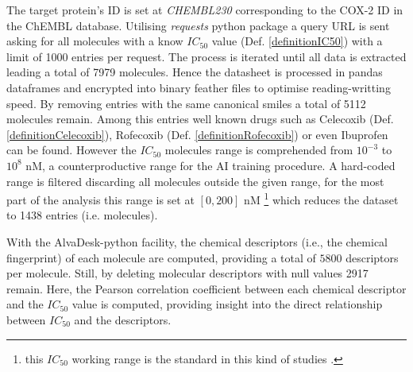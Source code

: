 \documentclass[11pt]{article}
\begin{document}
The target protein's ID is set at \emph{CHEMBL230} corresponding to the COX-2 ID in the ChEMBL database. Utilising \emph{requests} python package\cite{PythonPackageRequests} a query URL is sent asking for all molecules with a know $IC_{50}$ value (Def. \ref{definitionIC50}) with a limit of 1000 entries per request. The process is iterated until all data is extracted leading a total of 7979 molecules. Hence the datasheet is processed in pandas dataframes\cite{PythonPackagePandas} and encrypted into binary feather files to optimise reading-writting speed. By removing entries with the same canonical smiles a total of 5112 molecules remain. Among this entries well known drugs such as Celecoxib (Def. \ref{definitionCelecoxib}), Rofecoxib (Def. \ref{definitionRofecoxib}) or even Ibuprofen can be found. However the $IC_{50}$ molecules range is comprehended from $10^{-3}$ to $10^{8}$ nM, a counterproductive range for the AI training procedure. A hard-coded range is filtered discarding all molecules outside the given range, for the most part of the analysis this range is set at $[0,200]$ nM \footnote{this $IC_{50}$ working range is the standard in this kind of studies \cite{MachineLearningPaper5Lipoxygenase}.} which reduces the dataset to 1438 entries (i.e. molecules). \par 
With the AlvaDesk-python \cite{AlvaDescSecondPaper} facility, the chemical descriptors (i.e., the chemical fingerprint) of each molecule are computed, providing a total of $5800$ descriptors per molecule. Still, by deleting molecular descriptors with null values 2917 remain. Here, the Pearson correlation coefficient between each chemical descriptor and the $IC_{50}$ value is computed, providing insight into the direct relationship between $IC_{50}$ and the descriptors.
\end{document}
